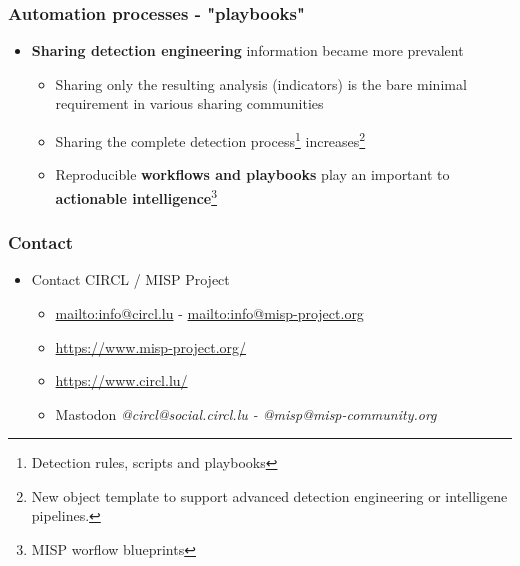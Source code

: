 \begin{frame}
  \frametitle{Automation processes - "playbooks"}
  \begin{itemize}
      \item {\bf Sharing detection engineering} information became more prevalent
              \begin{itemize}
                    \item Sharing only the resulting analysis (indicators) is the bare minimal requirement in various sharing communities
                    \item Sharing the complete detection process\footnote{Detection rules, scripts and playbooks} increases\footnote{New object template to support advanced detection engineering or intelligene pipelines.}
                    \item Reproducible {\bf workflows and playbooks} play an important to {\bf actionable intelligence}\footnote{MISP worflow blueprints} 
              \end{itemize}
  \end{itemize}
\end{frame}

\begin{frame}
    \frametitle{Contact}
  \begin{itemize}
      \item Contact CIRCL / MISP Project
    \begin{itemize}
        \item \url{mailto:info@circl.lu} - \url{mailto:info@misp-project.org}
      \item \url{https://www.misp-project.org/}
      \item \url{https://www.circl.lu/}
      \item Mastodon {\it @circl@social.circl.lu - @misp@misp-community.org}
    \end{itemize}
  \end{itemize}
\end{frame}

